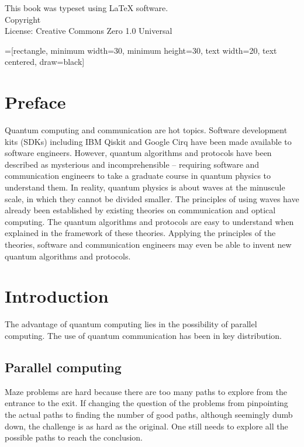 \documentclass{book}
\makeatletter
\newcommand{\booklicense}{Creative Commons Zero 1.0 Universal}
\newcommand{\bookauthor}{\@author}
\makeatother
\begin{document}
\begin{flushleft}
\vspace*{\fill}
This book was typeset using \LaTeX{} software.\\
\vspace{\fill}
Copyright \textcopyright{} \the\year{}  \bookauthor\\
License: \booklicense
\end{flushleft}

\addtocounter{page}{2}

=[rectangle, minimum width=30, minimum height=30, text width=20, text centered, draw=black]

\chapter*{Preface}
Quantum computing and communication are hot topics. Software development kits (SDKs) including IBM Qiskit and Google Cirq have been made available to software engineers. However, quantum algorithms and protocols have been described as mysterious and incomprehensible -- requiring software and communication engineers to take a graduate course in quantum physics to understand them. In reality, quantum physics is about waves at the minuscule scale, in which they cannot be divided smaller. The principles of using waves have already been established by existing theories on communication and optical computing. The quantum algorithms and protocols are easy to understand when explained in the framework of these theories. Applying the principles of the theories, software and communication engineers may even be able to invent new quantum algorithms and protocols.

\setcounter{tocdepth}{3}
\tableofcontents

\mainmatter

\chapter{Introduction}
The advantage of quantum computing lies in the possibility of parallel computing. The use of quantum communication has been in key distribution.

\section{Parallel computing}
Maze problems are hard because there are too many paths to explore from the entrance to the exit. If changing the question of the problems from pinpointing the actual paths to finding the number of good paths, although seemingly dumb down, the challenge is as hard as the original. One still needs to explore all the possible paths to reach the conclusion.
\end{document}
